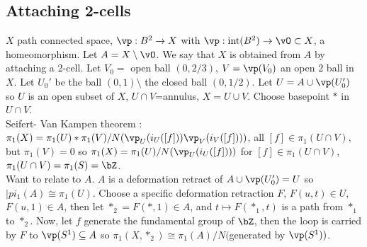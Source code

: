 
\subsection{Attaching 2-cells}

$X$ path connected space, $\vp: B^2 \to X$ with $\vp: \text{int}(B^2) \to \vO \subset X$, a homeomorphism. Let $A = X \setminus \vO$. We say that $X$ is obtained from $A$ by attaching a 2-cell. Let $V_0=$ open ball $(0, 2/3)$, $V = \vp(V_0)$ an open 2 ball in $X$. Let $U_0'$ be the ball $(0,1) \setminus$ the closed ball $(0, 1/2)$. Let $U = A \cup \vp(U_0')$ so $U$ is an open subset of $X$, $U \cap V$=annulus, $X = U \cup V$. Choose basepoint $*$ in $U \cap V$. \\
Seifert- Van Kampen theorem : $\pi_1(X) = \pi_1(U) * \pi_1(V)/N(\vp_U(i_U([f]))\vp_V(i_V([f])))$, all $[f] \in \pi_1(U \cap V)$, but $\pi_1(V) = 0$ so $\pi_1(X) = \pi_1(U)/N(\vp_U(i_U([f])))$ for $[f] \in \pi_1(U \cap V)$, $\pi_1(U \cap V) = \pi_1(S) = \bZ$. \\
Want to relate to $A$. $A$ is a deformation retract of $A \cup \vp(U_0')=U$ so $|pi_1(A) \cong \pi_1(U)$. Choose a specific deformation retraction $F$, $F(u,t) \in U$, $F(u,1) \in A$, then let $*_2 = F(*, 1) \in A$, and $t \mapsto F(*_1, t)$ is a path from $*_1$ to $*_2$. Now, let $f$ generate the fundamental group of $\bZ$, then the loop is carried by $F$ to $\vp(S^1) \subseteq A$ so $\pi_1(X, *_2) \cong \pi_1(A)/N($generated by $\vp(S^1))$. 
